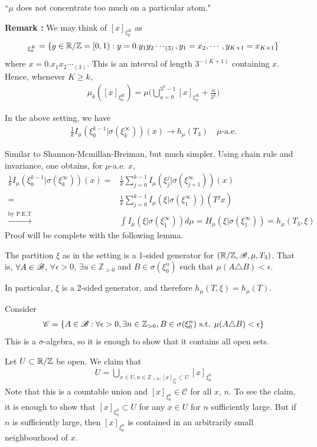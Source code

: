 \documentclass[12pt,a4paper]{report}
\newenvironment{proof}
{\begin{changemargin}{1cm}{0.5cm} 
	}%
	{\end{changemargin}
}
\newenvironment{subproof}
{\begin{changemargin}{0.5cm}{0.5cm}
	}%
	{\end{changemargin}
}
\begin{document}
``$\mu$ does not concentrate too much on a particular atom."
\s

\textbf{Remark :} We may think of $[x]_{\xi_0^K}$ as
\begin{align*}
[x]_{\xi_0^K} = \{ y\in \reals/\mathbb{Z} =[0,1) : y = 0.y_1y_2\cdots_{(3)}, y_1=x_2, \cdots, y_{K+1} = x_{K+1} \}
\end{align*}
where $x=0.x_1x_2 \cdots_{(3)}$. This is an interval of length $3^{-(K+1)}$ containing $x$. Hence, whenever $K\geq k$,
\begin{align*}
\mu_k([x]_{\xi_0^K}) = \mu \Big( \bigcup_{a=0}^{3^k-1} [x]_{\xi_0^K} + \frac{a}{3^k} \Big) 
\end{align*}
\s

\lem In the above setting, we have
\begin{align*}
\frac{1}{k}I_{\mu}(\xi_0^{k-1}|\sigma(\xi_k^{\infty}))(x) \rightarrow h_{\mu}(T_3) \quad \mu\text{-a.e.}
\end{align*}
\begin{proof}
\pf Similar to Shannon-Mcmillan-Breiman, but much simpler. Using chain rule and invariance, one obtains, for $\mu$-a.e. $x$,
\begin{align*}
\frac{1}{k}I_{\mu}(\xi_0^{k-1} | \sigma(\xi_k^{\infty}))(x) =& \frac{1}{k} \sum_{j=0}^{k-1} I_{\mu}(\xi_j^j | \sigma(\xi_{j+1}^{\infty}))(x) \\
=& \frac{1}{k} \sum_{j=0}^{k-1} I_{\mu}(\xi | \sigma(\xi_1^{\infty})) (T^j x) \\
\xrightarrow{\text{by P.E.T}} & \int I_{\mu}(\xi | \sigma(\xi_1^{\infty})) d\mu = H_{\mu}(\xi|\sigma(\xi^{\infty}_1))= h_{\mu}(T_3,\xi)
\end{align*}
Proof will be complete with the following lemma.
\begin{subproof}
\lem The partition $\xi$ as in the setting is a 1-sided generator for $(\mathbb{R}/ \mathbb{Z}, \mathscr{B}, \mu, T_3)$. That is, $\forall A \in \mathscr{B}$, $\forall \epsilon>0$, $\exists u \in \mathbb{Z}_{>0}$ and $B\in \sigma(\xi_0^n)$ such that $\mu(A \triangle B) < \epsilon$.

\quad In particular, $\xi$ is a 2-sided generator, and therefore $h_{\mu}(T,\xi) = h_{\mu}(T)$.

\pf Consider
\begin{align*}
\mathscr{C} = \{ A\in \mathscr{B} : \forall\epsilon >0, \exists n\in \mathbb{Z}_{>0},B\in \sigma(\xi_0^{n})\text{ s.t. } \mu(A\triangle B)<\epsilon \}
\end{align*}
This is a $\sigma$-algebra, so it is enough to show that it contains all open sets. 

\quad Let $U\subset \mathbb{R}/\mathbb{Z}$ be open. We claim that
\begin{align*}
U = \bigcup_{x\in U, n\in \mathbb{Z}_{>0}, [x]_{\xi_0^n} \subset U} [x]_{\xi_0^n}
\end{align*}
Note that this is a countable union and $[x]_{\xi_0^n} \in \mathscr{C}$ for all $x$, $n$. To see the claim, it is enough to show that $[x]_{\xi_0^n} \subset U$ for any $x\in U$ for $n$ sufficiently large. But if $n$ is sufficiently large, then $[x]_{\xi_0^n}$ is contained in an arbitrarily small neighbourhood of $x$.
\end{subproof}

\eop
\end{proof}
\end{document}
